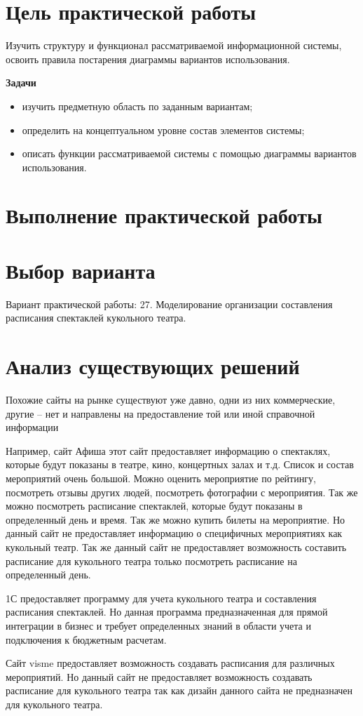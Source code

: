 \section*{\LARGE{Цель практической работы}}
Изучить структуру и функционал рассматриваемой
информационной системы, освоить правила постарения диаграммы вариантов
использования.\par
\textbf{Задачи}
\begin{itemize}
	\item изучить предметную область по заданным вариантам;
	\item определить на концептуальном уровне состав элементов системы;
	\item описать функции рассматриваемой системы с помощью диаграммы вариантов использования.
\end{itemize}
\newpage

\section*{\LARGE{Выполнение практической работы}}

\section{Выбор варианта}
Вариант практической работы: 27. Моделирование организации составления расписания спектаклей
кукольного театра.\par
\newpage

\section{Анализ существующих решений}
Похожие сайты на рынке существуют уже давно, одни из них коммерческие, другие – нет и  направлены на предоставление
той или иной справочной информации\par
Например, сайт Афиша этот сайт предоставляет информацию о спектаклях, которые будут показаны в театре, кино, концертных
залах и т.д. Список и состав мероприятий очень большой.
Можно оценить мероприятие по рейтингу, посмотреть отзывы других
людей, посмотреть фотографии с мероприятия.
Так же можно посмотреть расписание спектаклей, которые будут показаны в
определенный день и время.
Так же можно купить билеты на мероприятие.
Но данный сайт не предоставляет информацию о
специфичных мероприятиях как кукольный театр.
Так же данный сайт не предоставляет возможность составить расписание для
кукольного театра только посмотреть расписание на определенный день.\par
1С предоставляет программу для учета кукольного театра и составления расписания спектаклей.
Но данная программа
предназначенная для прямой интеграции в бизнес и требует определенных знаний в области учета и подключения к бюджетным
расчетам.\par
Сайт visme предоставляет возможность создавать расписания для различных мероприятий.
Но данный сайт не предоставляет
возможность создавать расписание для кукольного театра так как дизайн данного сайта не предназначен для кукольного
театра.
\newpage

